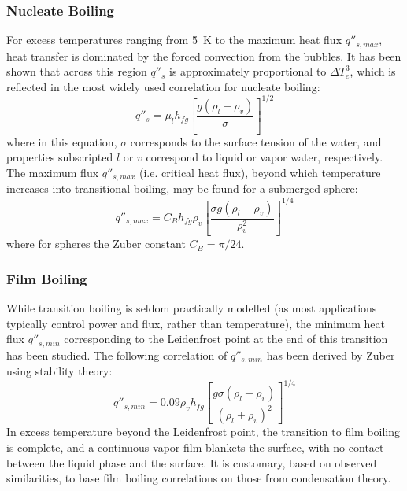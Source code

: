 \documentclass[12pt]{article}
\newcommand{\Te}{\Delta T_e}
\begin{document}
\subsubsection{Nucleate Boiling}
For excess temperatures ranging from \~5~K to the maximum heat flux $q''_{s,max}$, heat transfer is dominated by the forced convection from the bubbles.
It has been shown\cite{osti_4142385} that across this region $q''_s$ is approximately proportional to $\Te^3$, which is reflected in the most widely used correlation\cite{bergman_fundamentals_2017} for nucleate boiling:
\begin{equation}
    q''_s = \mu_lh_{fg}\left[\frac{g(\rho_l-\rho_v)}{\sigma}\right]^{1/2}
    \label{eq:nucl_boil}
\end{equation}
where in this equation, $\sigma$ corresponds to the surface tension of the water, and properties subscripted $l$ or $v$ correspond to liquid or vapor water, respectively.\\

The maximum flux $q''_{s,max}$ (i.e. critical heat flux), beyond which temperature increases into transitional boiling, may be found for a submerged sphere\cite{bergman_fundamentals_2017}:
\begin{equation}
    q''_{s,max} = C_Bh_{fg}\rho_v\left[\frac{\sigma g(\rho_l-\rho_v)}{\rho_v^2}\right]^{1/4}
    \label{eq:qmax}
\end{equation}
where for spheres the Zuber constant $C_B = \pi/24$.

\subsubsection{Film Boiling}
While transition boiling is seldom practically modelled (as most applications typically control power and flux, rather than temperature), the minimum heat flux $q''_{s,min}$ corresponding to the Leidenfrost point at the end of this transition has been studied.
\newcommand{\qmin}{q''_{s,min}}
The following correlation of $\qmin$ has been derived by Zuber using stability theory\cite{bergman_fundamentals_2017}:
\begin{equation}
    \qmin = 0.09\rho_v h_{fg} \left[\frac{g\sigma(\rho_l-\rho_v)}{(\rho_l+\rho_v)^2}\right]^{1/4}
    \label{eq:qmin}
\end{equation}
In excess temperature beyond the Leidenfrost point, the transition to film boiling is complete, and a continuous vapor film blankets the surface, with no contact between the liquid phase and the surface.
It is customary, based on observed similarities, to base film boiling correlations on those from condensation theory.
\end{document}
